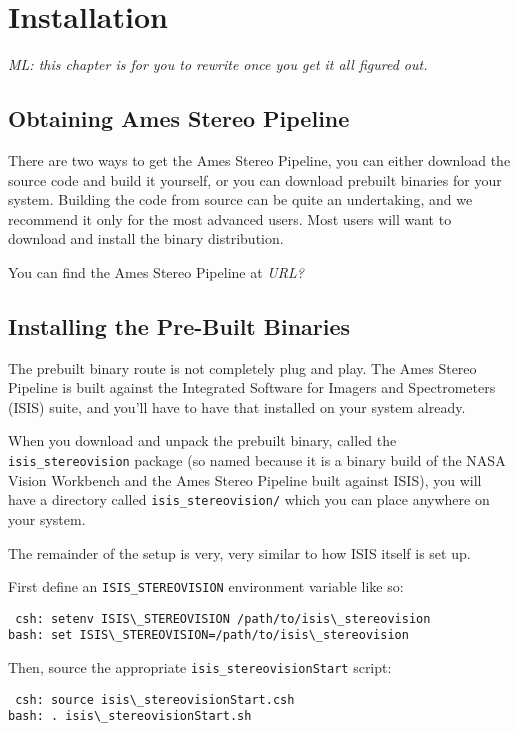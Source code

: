 \chapter{Installation}

\emph{ML: this chapter is for you to rewrite once you get it all figured out.}

\section{Obtaining Ames Stereo Pipeline}

There are two ways to get the Ames Stereo Pipeline, you can either
download the source code and build it yourself, or you can download
prebuilt binaries for your system.  Building the code from source can
be quite an undertaking, and we recommend it only for the most
advanced users.  Most users will want to download and install the
binary distribution.

You can find the Ames Stereo Pipeline at \emph{URL?}

\section{Installing the Pre-Built Binaries}

The prebuilt binary route is not completely plug and play.  The
Ames Stereo Pipeline is built against the Integrated Software for
Imagers and Spectrometers (ISIS) suite, and you'll have to have
that installed on your system already.

When you download and unpack the prebuilt binary, called the
\texttt{isis\_stereovision} package (so named because it is a binary
build of the NASA Vision Workbench and the Ames Stereo Pipeline
built against ISIS), you will have a directory called
\texttt{isis\_stereovision/} which you can place anywhere on your
system.

The remainder of the setup is very, very similar to how ISIS itself
is set up.

First define an \texttt{ISIS\_STEREOVISION} environment variable like so:
\begin{verbatim}
 csh: setenv ISIS\_STEREOVISION /path/to/isis\_stereovision
bash: set ISIS\_STEREOVISION=/path/to/isis\_stereovision
\end{verbatim}

Then, source the appropriate \texttt{isis\_stereovisionStart} script:
\begin{verbatim}
 csh: source isis\_stereovisionStart.csh
bash: . isis\_stereovisionStart.sh
\end{verbatim}

